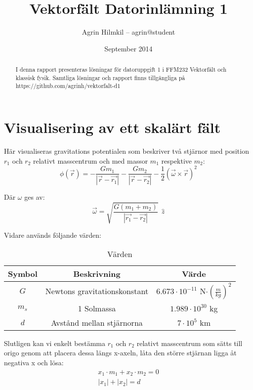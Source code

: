 \documentclass[12pt,a4paper]{article}
\begin{document}
\title{Vektorfält Datorinlämning 1}
\author{Agrin Hilmkil -- agrin@student}
\date{September 2014}
\maketitle

\begin{abstract}
I denna rapport presenteras lösningar för datoruppgift 1 i FFM232 Vektorfält och klassisk fysik. Samtliga lösningar och rapport finns tillgängliga på https://github.com/agrinh/vektorfalt-d1
\end{abstract}

\newpage
\tableofcontents
\newpage

\section{Visualisering av ett skalärt fält}

Här visualiseras gravitations potentialen som beskriver två stjärnor med position $r_1$ och $r_2$ relativt masscentrum och med massor $m_1$ respektive $m_2$:
\begin{equation}
\phi (\vec{r}) = - \frac{Gm_1}{|\vec{r} - \vec{r_1}|} - \frac{Gm_2}{|\vec{r} - \vec{r_2}|} - \frac{1}{2}(\vec{\omega} \times \vec{r})^2
\end{equation}

Där $\omega$ ges av:
\begin{equation}
\vec{\omega} = \sqrt{\frac{G(m_1 + m_2)}{|\vec{r_1}-\vec{r_2}|}}\ \ \hat{z}
\end{equation}

Vidare används följande värden:
\begin{table}[h!]
\centering
\begin{tabular}{c|c|c}
 Symbol & Beskrivning & Värde \\
 \hline
 $G$ & Newtons gravitationskonstant & $6.673\cdot10^{-11}$ \unit{N$\cdot(\frac{m}{kg})^2$} \\
 $m_s$ & 1 Solmassa & $1.989\cdot10^{30}$ \unit{kg} \\
 $d$ & Avstånd mellan stjärnorna & $7\cdot10^{5}$ \unit{km}
\end{tabular}
\caption{Värden}
\label{tab:konstanter}
\end{table}

Slutligen kan vi enkelt bestämma $r_1$ och $r_2$ relativt masscentrum som sätts till origo genom att placera dessa längs x-axeln, låta den större stjärnan ligga åt negativa x och lösa:
\begin{equation}
\begin{array}{lcl}
x_1 \cdot m_1 + x_2 \cdot m_2 = 0 \\
|x_1| + |x_2| = d
\end{array}
\end{equation}
\end{document}
